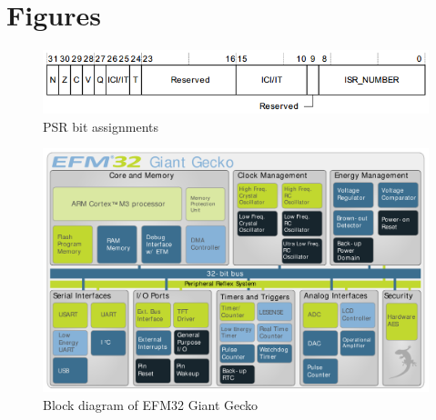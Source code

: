 \chapter{Figures}

\begin{figure}[ht]
 \centering
 \includegraphics[width=\textwidth]{images/psr_map.png}
 \caption{PSR bit assignments}
 \label{fig:PSRMap}
\end{figure}

\begin{figure}[ht]
 \centering
 \includegraphics[width=\textwidth]{images/giant_gecko_map.png}
 \caption{Block diagram of EFM32 Giant Gecko}
 \label{fig:GiantGeckoMap}
\end{figure}

